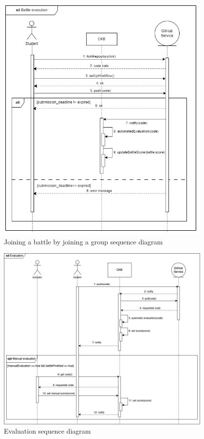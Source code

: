 \begin{figure}[H]
    \centering
    \includegraphics[width=0.95\textwidth]{images/seq_diagrams/battle_execution.png}
    \caption{Joining a battle by joining a group sequence diagram}
    \label{fig:sequence_diagram}
\end{figure}
\clearpage

\begin{figure}[H]
    \centering
    \includegraphics[width=0.95\textwidth]{images/seq_diagrams/Evaluation.jpg}
    \caption{Evaluation sequence diagram}
    \label{fig:sequence_diagram}
\end{figure}
\clearpage

